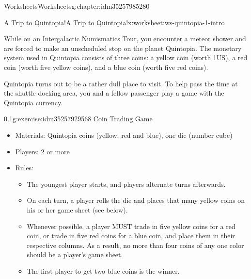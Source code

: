 \documentclass[twoside,11pt,]{book}
\begin{document}
\begin{chapterptx}{Worksheets}{}{Worksheets}{}{}{g:chapter:idm35257985280}
%
%
\typeout{************************************************}
\typeout{************************************************}
%
\begin{worksheet-section-numberless}{A Trip to Quintopia!}{}{A Trip to Quintopia!}{}{}{x:worksheet:ws-quintopia-1-intro}
\begin{introduction}{}%
While on an Intergalactic Numismatics Tour, you encounter a meteor shower and are forced to make an unscheduled stop on the planet Quintopia.  The monetary system used in Quintopia consists of three coins:  a yellow coin (worth \textdollar{}1US), a red coin (worth five yellow coins), and a blue coin (worth five red coins).%
\par
Quintopia turns out to be a rather dull place to visit.  To help pass the time at the shuttle docking area, you and a fellow passenger play a game with the Quintopia currency.%
\end{introduction}%
\begin{divisionexercise}{1}{}{0.1}{g:exercise:idm35257929568}%
Coin Trading Game%
%
\begin{itemize}[label=\textbullet]
\item{}Materials:  Quintopia coins (yellow, red and blue), one die (number cube)%
\item{}Players:  2 or more%
\item{}Rules:%
\begin{itemize}[label=$\circ$]
\item{}The youngest player starts, and players alternate turns afterwards.%
\item{}On each turn, a player rolls the die and places that many yellow coins on his or her game sheet (see below).%
\item{}Whenever possible, a player MUST trade in five yellow coins for a red coin, or trade in five red coins for a blue coin, and place them in their respective columns.  As a result, no more than four coins of any one color should be a player’s game sheet.%
\item{}The first player to get two blue coins is the winner.%
\end{itemize}
%
\end{itemize}
\begin{sidebyside}{1}{0}{0}{0}%
\begin{sbspanel}{1}%

\end{sbspanel}
\end{sidebyside}
\end{divisionexercise}
\end{worksheet-section-numberless}
\end{chapterptx}
\end{document}
